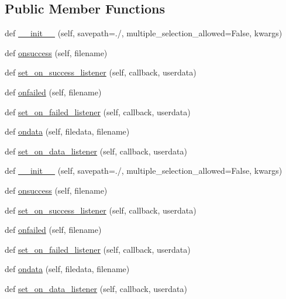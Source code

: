 \subsection*{Public Member Functions}
\begin{DoxyCompactItemize}
\item 
def \hyperlink{classremi_1_1gui_1_1FileUploader_aecabe8b6d84e2cf14703d88ba3736633}{\+\_\+\+\_\+init\+\_\+\+\_\+} (self, savepath=\textquotesingle{}./\textquotesingle{}, multiple\+\_\+selection\+\_\+allowed=False, kwargs)
\item 
def \hyperlink{classremi_1_1gui_1_1FileUploader_aad3d08bc689526321294786dd09613cf}{onsuccess} (self, filename)
\item 
def \hyperlink{classremi_1_1gui_1_1FileUploader_a0855160a9b0f52ff31aa7d6561f32038}{set\+\_\+on\+\_\+success\+\_\+listener} (self, callback, userdata)
\item 
def \hyperlink{classremi_1_1gui_1_1FileUploader_ade6a041ea0bcc7608c559cd860c32eea}{onfailed} (self, filename)
\item 
def \hyperlink{classremi_1_1gui_1_1FileUploader_a6fb7795ee0173250c2788975e6bcf5ed}{set\+\_\+on\+\_\+failed\+\_\+listener} (self, callback, userdata)
\item 
def \hyperlink{classremi_1_1gui_1_1FileUploader_a2c3e86dd58017e56d87323b4f738439e}{ondata} (self, filedata, filename)
\item 
def \hyperlink{classremi_1_1gui_1_1FileUploader_a7dfc6cb9332ac30f340fd1aad6dcc647}{set\+\_\+on\+\_\+data\+\_\+listener} (self, callback, userdata)
\item 
def \hyperlink{classremi_1_1gui_1_1FileUploader_aecabe8b6d84e2cf14703d88ba3736633}{\+\_\+\+\_\+init\+\_\+\+\_\+} (self, savepath=\textquotesingle{}./\textquotesingle{}, multiple\+\_\+selection\+\_\+allowed=False, kwargs)
\item 
def \hyperlink{classremi_1_1gui_1_1FileUploader_aad3d08bc689526321294786dd09613cf}{onsuccess} (self, filename)
\item 
def \hyperlink{classremi_1_1gui_1_1FileUploader_a0855160a9b0f52ff31aa7d6561f32038}{set\+\_\+on\+\_\+success\+\_\+listener} (self, callback, userdata)
\item 
def \hyperlink{classremi_1_1gui_1_1FileUploader_ade6a041ea0bcc7608c559cd860c32eea}{onfailed} (self, filename)
\item 
def \hyperlink{classremi_1_1gui_1_1FileUploader_a6fb7795ee0173250c2788975e6bcf5ed}{set\+\_\+on\+\_\+failed\+\_\+listener} (self, callback, userdata)
\item 
def \hyperlink{classremi_1_1gui_1_1FileUploader_a2c3e86dd58017e56d87323b4f738439e}{ondata} (self, filedata, filename)
\item 
def \hyperlink{classremi_1_1gui_1_1FileUploader_a7dfc6cb9332ac30f340fd1aad6dcc647}{set\+\_\+on\+\_\+data\+\_\+listener} (self, callback, userdata)
\end{DoxyCompactItemize}
